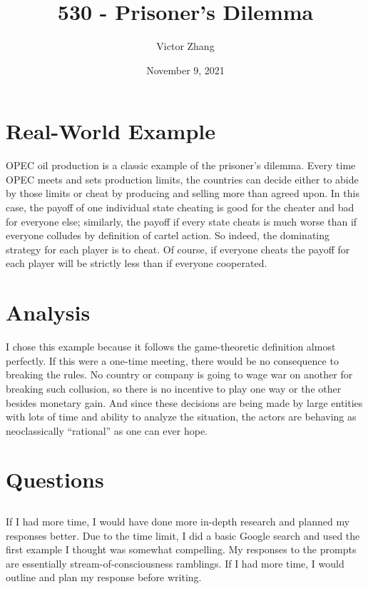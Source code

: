 \documentclass{article}
\title{530 - Prisoner's Dilemma}
\author{Victor Zhang}
\date{November 9, 2021}
\begin{document}
\maketitle

\section{Real-World Example}
OPEC oil production is a classic example of the prisoner’s dilemma. Every time OPEC meets and sets production limits, the countries can decide either to abide by those limits or cheat by producing and selling more than agreed upon. In this case, the payoff of one individual state cheating is good for the cheater and bad for everyone else; similarly, the payoff if every state cheats is much worse than if everyone colludes by definition of cartel action. So indeed, the dominating strategy for each player is to cheat. Of course, if everyone cheats the payoff for each player will be strictly less than if everyone cooperated.

\section{Analysis}
I chose this example because it follows the game-theoretic definition almost perfectly. If this were a one-time meeting, there would be no consequence to breaking the rules. No country or company is going to wage war on another for breaking such collusion, so there is no incentive to play one way or the other besides monetary gain. And since these decisions are being made by large entities with lots of time and ability to analyze the situation, the actors are behaving as neoclassically “rational” as one can ever hope.

\section{Questions}
\subsection{}
If I had more time, I would have done more in-depth research and planned my responses better. Due to the time limit, I did a basic Google search and used the first example I thought was somewhat compelling. My responses to the prompts are essentially stream-of-consciousness ramblings. If I had more time, I would outline and plan my response before writing.
\end{document}
